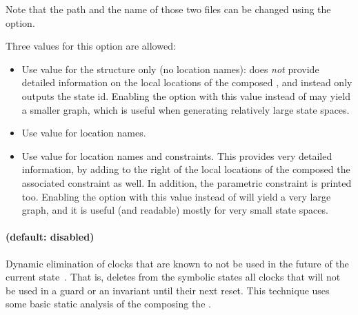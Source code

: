 Note that the path and the name of those two files can be changed using the  option.

Three values for this option are allowed:
\begin{itemize}
	\item Use value  for the structure only (no location names): does \emph{not} provide detailed information on the local locations of the composed \IPTA{}, and instead only outputs the state id.
	      Enabling the option with this value instead of  may yield a smaller graph, which is useful when generating relatively large state spaces.

	\item Use value  for location names.

	\item Use value  for location names and constraints.
	      This provides very detailed information, by adding to the right of the local locations of the composed \IPTA{} the associated constraint as well.
	      In addition, the parametric constraint is printed too.
	      Enabling the option with this value instead of  will yield a very large graph, and it is useful (and readable) mostly for very small state spaces.

\end{itemize}





\paragraph{ (default: disabled)}
Dynamic elimination of clocks that are known to not be used in the future of the current state~\cite{Andre13FSFMA}.
That is, \imitator{} deletes from the symbolic states all clocks that will not be used in a guard or an invariant until their next reset.
This technique uses some basic static analysis of the \IPTA{} composing the \NIPTA{}.


